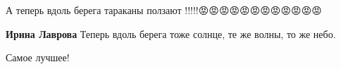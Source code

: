  
 
 
 
 

\qqSecCmt


А теперь вдоль берега тараканы ползают !!!!!😡😡😡😡😡😡😡😡😡😡😡😡

\textbf{Ирина Лаврова} Теперь вдоль берега тоже солнце, те же волны, то же небо.


Самое лучшее!

